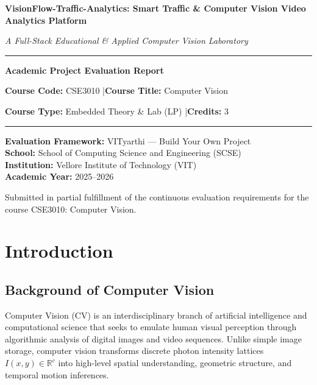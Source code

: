 \documentclass[12pt,a4paper]{article}
\begin{document}
\begin{titlepage}
    \centering
    \vspace*{1.5cm}
    {\Huge \textbf{VisionFlow-Traffic-Analytics: Smart Traffic \& Computer Vision Video Analytics Platform}\par}
    \vspace{0.8cm}
    {\Large \textit{A Full-Stack Educational \& Applied Computer Vision Laboratory}\par}
    \vspace{1.5cm}
    \rule{\linewidth}{0.5mm}\par
    \vspace{0.6cm}
    {\LARGE \textbf{Academic Project Evaluation Report}\par}
    \vspace{0.3cm}
    {\large \textbf{Course Code:} CSE3010 \quad|\quad \textbf{Course Title:} Computer Vision\par}
    {\large \textbf{Course Type:} Embedded Theory \& Lab (LP) \quad|\quad \textbf{Credits:} 3\par}
    \rule{\linewidth}{0.5mm}\par
    \vspace{2.0cm}
    
    \begin{minipage}{0.8\textwidth}
        \centering
        \textbf{Evaluation Framework:} VITyarthi — Build Your Own Project\\
        \textbf{School:} School of Computing Science and Engineering (SCSE)\\
        \textbf{Institution:} Vellore Institute of Technology (VIT)\\
        \textbf{Academic Year:} 2025--2026
    \end{minipage}
    
    \vfill
    {\small Submitted in partial fulfillment of the continuous evaluation requirements for the course CSE3010: Computer Vision.\par}
\end{titlepage}

\tableofcontents
\newpage

\section{Introduction}

\subsection{Background of Computer Vision}
Computer Vision (CV) is an interdisciplinary branch of artificial intelligence and computational science that seeks to emulate human visual perception through algorithmic analysis of digital images and video sequences. Unlike simple image storage, computer vision transforms discrete photon intensity lattices $I(x, y) \in \mathbb{R}^c$ into high-level spatial understanding, geometric structure, and temporal motion inferences.
\end{document}
